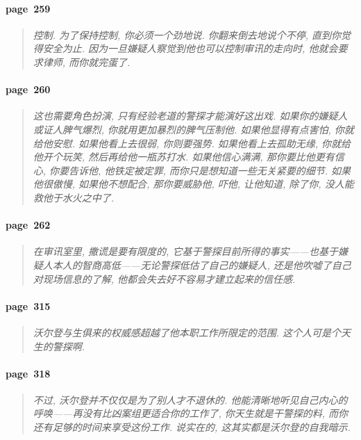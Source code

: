 \paragraph*{page~259}
\begin{quotation}
    \itshape
    控制. 为了保持控制, 你必须一个劲地说. 你翻来倒去地说个不停, 直到你觉得安全为止. 因为一旦嫌疑人察觉到他也可以控制审讯的走向时, 他就会要求律师, 而你就完蛋了. 
\end{quotation}

\paragraph*{page~260}
\begin{quotation}
    \itshape
    这也需要角色扮演, 只有经验老道的警探才能演好这出戏. 如果你的嫌疑人或证人脾气爆烈, 你就用更加暴烈的脾气压制他. 如果他显得有点害怕, 你就给他安慰. 如果他看上去很弱, 你则要强势. 如果他看上去孤助无缘, 你就给他开个玩笑, 然后再给他一瓶苏打水. 如果他信心满满, 那你要比他更有信心, 你要告诉他, 他铁定被定罪, 而你只是想知道一些无关紧要的细节. 如果他很傲慢, 如果他不想配合, 那你要威胁他, 吓他, 让他知道, 除了你, 没人能救他于水火之中了.  
\end{quotation}

\paragraph*{page~262}
\begin{quotation}
    \itshape
    在审讯室里, 撒谎是要有限度的, 它基于警探目前所得的事实------也基于嫌疑人本人的智商高低------无论警探低估了自己的嫌疑人, 还是他吹嘘了自己对现场信息的了解, 他都会失去好不容易才建立起来的信任感. 
\end{quotation}

\paragraph*{page~315}
\begin{quotation}
    \itshape
    沃尔登与生俱来的权威感超越了他本职工作所限定的范围. 这个人可是个天生的警探啊. 
\end{quotation}

\paragraph*{page~318}
\begin{quotation}
    \itshape
    不过, 沃尔登并不仅仅是为了别人才不退休的. 他能清晰地听见自己内心的呼唤------再没有比凶案组更适合你的工作了, 你天生就是干警探的料, 而你还有足够的时间来享受这份工作. 说实在的, 这其实都是沃尔登的自我暗示. 
\end{quotation}

